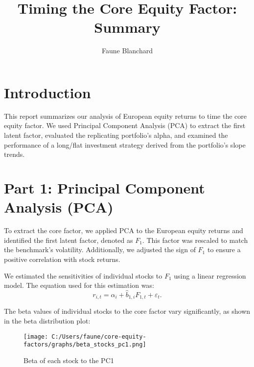 \documentclass[
  a4paper]{article}
\title{Timing the Core Equity Factor: Summary}
\author{Faune Blanchard}
\date{}
\renewcommand*\contentsname{Table of contents}
\newcommand\contentsname{Table of contents}
\begin{document}
\maketitle
\ifdefined\Shaded\renewenvironment{Shaded}{\begin{tcolorbox}[boxrule=0pt, frame hidden, borderline west={3pt}{0pt}{shadecolor}, interior hidden, breakable, sharp corners, enhanced]}{\end{tcolorbox}}\fi

\renewcommand*\contentsname{Table of contents}
{
\hypersetup{linkcolor=}
\setcounter{tocdepth}{4}
\tableofcontents
}
\newpage

\hypertarget{introduction}{%
\section{Introduction}\label{introduction}}

This report summarizes our analysis of European equity returns to time
the core equity factor. We used Principal Component Analysis (PCA) to
extract the first latent factor, evaluated the replicating portfolio's
alpha, and examined the performance of a long/flat investment strategy
derived from the portfolio's slope trends.

\hypertarget{part-1-principal-component-analysis-pca}{%
\section{Part 1: Principal Component Analysis
(PCA)}\label{part-1-principal-component-analysis-pca}}

To extract the core factor, we applied PCA to the European equity
returns and identified the first latent factor, denoted as \(F_1\). This
factor was rescaled to match the benchmark's volatility. Additionally,
we adjusted the sign of \(F_1\) to ensure a positive correlation with
stock returns.

We estimated the sensitivities of individual stocks to \(F_1\) using a
linear regression model. The equation used for this estimation was:
\[r_{i,t} = \alpha_i + \hat{b}_{1,i} F_{1,t} + \varepsilon_t.\]

The beta values of individual stocks to the core factor vary
significantly, as shown in the beta distribution plot:

\begin{figure}

{\centering \texttt{[image: C:/Users/faune/core-equity-factors/graphs/beta\_stocks\_pc1.png]}

}

\caption{Beta of each stock to the PC1}

\end{figure}
\end{document}
